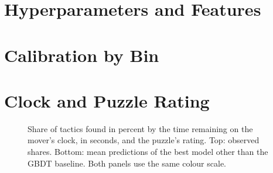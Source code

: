 \documentclass[11pt]{article}
\begin{document}



\clearpage
\appendix

\section{Hyperparameters and Features}

\begin{table}[htbp]\centering\footnotesize
{}
\caption{Hyperparameters of the networks of the fixed sequence, from their
configuration files. \emph{LR} is the peak learning rate. Values shared by
all of them are given below the table.}
\label{tab:settings}
\end{table}

\begin{table}[htbp]\centering\footnotesize
{}
\caption{Hand-crafted features: the inputs of  in addition
to the scalar context features, and of a network whose configuration includes
them.}
\label{tab:hand}
\end{table}

\section{Calibration by Bin}

\begin{table}[htbp]\centering\small
{}
\caption{Calibration by bin on the test set, for the best model and the GBDT
baseline. The bins of each model are formed from its own predicted
probabilities and have equal size. \emph{Predicted} is the mean predicted
probability in a bin, and \emph{observed} is the share of tactics in the bin
that were found.}
\label{tab:calibration}
\end{table}

\iflook
\section{Clock and Puzzle Rating}

\begin{figure}[htbp]\centering
{}

\medskip
{}
\caption{Share of tactics found in percent by the time remaining on the
mover's clock, in seconds, and the puzzle's rating. Top: observed shares.
Bottom: mean predictions of the best model other than the GBDT baseline. Both
panels use the same colour scale.}
\label{fig:grid-clock}
\end{figure}
\end{document}
